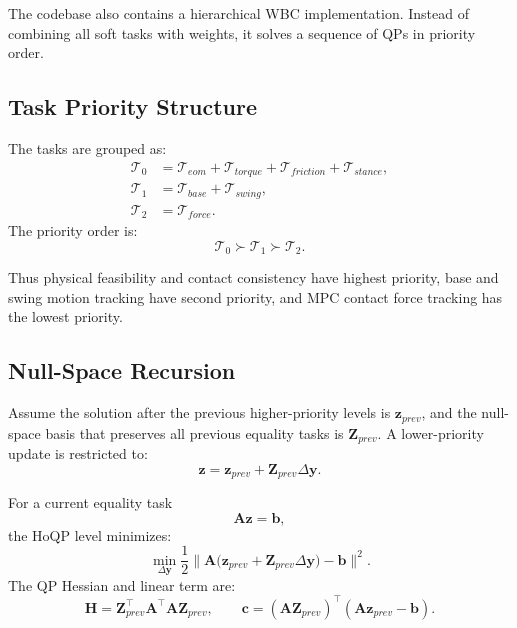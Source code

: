 \documentclass[11pt,a4paper]{article}
\begin{document}
The codebase also contains a hierarchical WBC implementation. Instead of combining all soft tasks with weights, it solves a sequence of QPs in priority order.

\subsection{Task Priority Structure}

The tasks are grouped as:
\begin{align}
	\mathcal{T}_0
	&=
	\mathcal{T}_{eom}
	+
	\mathcal{T}_{torque}
	+
	\mathcal{T}_{friction}
	+
	\mathcal{T}_{stance},\\
	\mathcal{T}_1
	&=
	\mathcal{T}_{base}
	+
	\mathcal{T}_{swing},\\
	\mathcal{T}_2
	&=
	\mathcal{T}_{force}.
\end{align}
The priority order is:
\begin{equation}
	\mathcal{T}_0
	\succ
	\mathcal{T}_1
	\succ
	\mathcal{T}_2.
\end{equation}

Thus physical feasibility and contact consistency have highest priority, base and swing motion tracking have second priority, and MPC contact force tracking has the lowest priority.

\subsection{Null-Space Recursion}

Assume the solution after the previous higher-priority levels is $\bm{z}_{prev}$, and the null-space basis that preserves all previous equality tasks is $\bm{Z}_{prev}$. A lower-priority update is restricted to:
\begin{equation}
	\bm{z}
	=
	\bm{z}_{prev}
	+
	\bm{Z}_{prev}\Delta\bm{y}.
\end{equation}

For a current equality task
\begin{equation}
	\bm{A}\bm{z}=\bm{b},
\end{equation}
the HoQP level minimizes:
\begin{equation}
	\min_{\Delta\bm{y}}
	\frac{1}{2}
	\bigl\|
		\bm{A}
		\bigl(
			\bm{z}_{prev}+\bm{Z}_{prev}\Delta\bm{y}
		\bigr)
		-
		\bm{b}
	\bigr\|^2.
\end{equation}
The QP Hessian and linear term are:
\begin{equation}
	\bm{H}
	=
	\bm{Z}_{prev}^{\top}\bm{A}^{\top}\bm{A}\bm{Z}_{prev},
	\qquad
	\bm{c}
	=
	(\bm{A}\bm{Z}_{prev})^{\top}
	(\bm{A}\bm{z}_{prev}-\bm{b}).
\end{equation}
\end{document}
